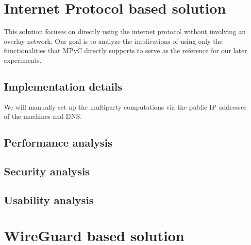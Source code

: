 \hypertarget{thesis__050-internet-protocol.md}{}
\hypertarget{thesis__050-internet-protocol.md__internet-protocol-based-solution}{%
\chapter{Internet Protocol based
solution}\label{thesis__050-internet-protocol.md__internet-protocol-based-solution}}

This solution focuses on directly using the internet protocol without
involving an overlay network. Our goal is to analyze the implications of
using only the functionalities that MPyC directly supports to serve as
the reference for our later experiments.

\hypertarget{thesis__050-internet-protocol.md__implementation-details}{%
\section{Implementation
details}\label{thesis__050-internet-protocol.md__implementation-details}}

We will manually set up the multiparty computations via the public IP
addresses of the machines and DNS.

\hypertarget{thesis__050-internet-protocol.md__performance-analysis}{%
\section{Performance
analysis}\label{thesis__050-internet-protocol.md__performance-analysis}}

\hypertarget{thesis__050-internet-protocol.md__security-analysis}{%
\section{Security
analysis}\label{thesis__050-internet-protocol.md__security-analysis}}

\hypertarget{thesis__050-internet-protocol.md__usability-analysis}{%
\section{Usability
analysis}\label{thesis__050-internet-protocol.md__usability-analysis}}

\hypertarget{thesis__060-wireguard.md}{}
\hypertarget{thesis__060-wireguard.md__wireguard-based-solution}{%
\chapter{WireGuard based
solution}\label{thesis__060-wireguard.md__wireguard-based-solution}}

